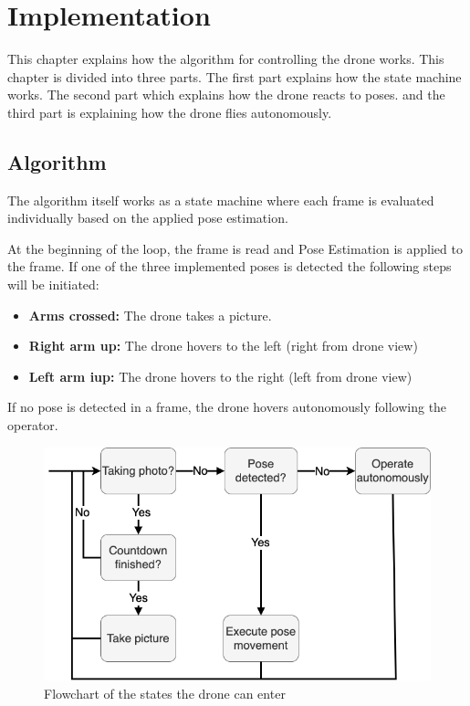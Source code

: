 \documentclass[a4paper,11pt,singlespacing]{article}
\begin{document}
\section{Implementation}
This chapter explains how the algorithm for controlling the drone works. This chapter is divided into three parts.
The first part explains how the state machine works.
The second part which explains how the drone reacts to poses.
and the third part is explaining how the drone flies autonomously.

\subsection{Algorithm}
The algorithm itself works as a state machine where each frame is evaluated 
individually based on the applied pose estimation. 

At the beginning of the loop, the frame is read and Pose Estimation is applied to the frame.
If one of the three implemented poses is detected the following steps will be initiated:
\begin{itemize}
	\item \textbf{Arms crossed:} The drone takes a picture.
	\item \textbf{Right arm up:} The drone hovers to the left (right from drone view)
	\item \textbf{Left arm iup:} The drone hovers to the right (left from drone view)
\end{itemize}

If no pose is detected in a frame, the drone hovers autonomously following the operator.

\begin{figure}[H]
	\centering
	\includegraphics[width=\textwidth]{images/flow_chart_code.png}
	\caption{Flowchart of the states the drone can enter}
	\label{flowchart_code}
\end{figure}
\end{document}

